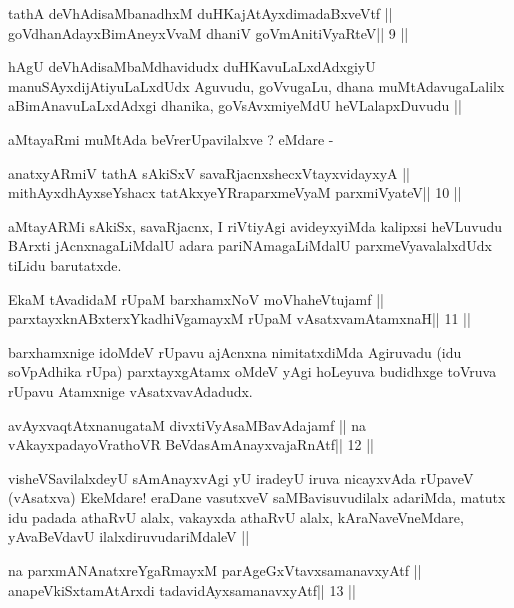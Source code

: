 \begin{shl}
tathA deVhAdisaMbanadhxM duHKajAtAyxdimadaBxveVtf ||
goVdhanAdayxBimAneyxVvaM dhaniV goVmAnitiVyaRteV\hfill || 9 ||
\end{shl}

\begin{artha}
hAgU deVhAdisaMbaMdhavidudx duHKavuLaLxdAdxgiyU
manuSAyxdijAtiyuLaLxdUdx Aguvudu, goVvugaLu, dhana muMtAdavugaLalilx
aBimAnavuLaLxdAdxgi dhanika, goVsAvxmiyeMdU heVLalapxDuvudu || 

aMtayaRmi muMtAda beVrerUpavilalxve ? eMdare -
\end{artha}

\begin{shl}
anatxyARmiV tathA sAkiSxV savaRjacnxshecxVtayxvidayxyA ||
mithAyxdhAyxseYshacx tatAkxyeYRraparxmeVyaM parxmiVyateV\hfill || 10 ||
\end{shl}

\begin{artha}
aMtayARMi sAkiSx, savaRjacnx, I riVtiyAgi avideyxyiMda kalipxsi
heVLuvudu BArxti jAcnxnagaLiMdalU adara pariNAmagaLiMdalU
parxmeVyavalalxdUdx tiLidu barutatxde.
\end{artha}

\begin{shl}
EkaM tAvadidaM rUpaM barxhamxNoV moVhaheVtujamf ||
parxtayxknABxterxYkadhiVgamayxM rUpaM vAsatxvamAtamxnaH\hfill || 11 ||
\end{shl}

\begin{artha}
barxhamxnige idoMdeV rUpavu ajAcnxna nimitatxdiMda Agiruvadu (idu
soVpAdhika rUpa) parxtayxgAtamx oMdeV yAgi hoLeyuva budidhxge toVruva
rUpavu Atamxnige vAsatxvavAdadudx.
\end{artha}

\begin{shl}
avAyxvaqtAtxnanugataM divxtiVyAsaMBavAdajamf ||
na vAkayxpadayoVrathoVR BeVdasAmAnayxvajaRnAtf\hfill || 12 ||
\end{shl}

\begin{artha}
visheVSavilalxdeyU sAmAnayxvAgi yU iradeyU iruva nicayxvAda rUpaveV
(vAsatxva) EkeMdare! eraDane vasutxveV saMBavisuvudilalx adariMda,
matutx idu padada athaRvU alalx, vakayxda athaRvU alalx,
kAraNaveVneMdare, yAvaBeVdavU ilalxdiruvudariMdaleV ||
\end{artha}

\begin{shl}
na parxmANAnatxreYgaRmayxM parAgeGxVtavxsamanavxyAtf ||
anapeVkiSxtamAtArxdi tadavidAyxsamanavxyAtf\hfill || 13 ||
\end{shl}

